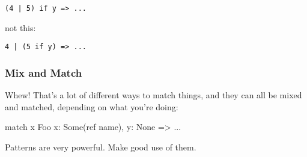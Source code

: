 \begin{verbatim}
(4 | 5) if y => ...
\end{verbatim}

not this:

\begin{verbatim}
4 | (5 if y) => ...
\end{verbatim}

\subsubsection*{Mix and Match}

Whew! That's a lot of different ways to match things, and they can all be mixed and matched, depending on what you're doing:

\begin{rustc}
match x {
    Foo { x: Some(ref name), y: None } => ...
}
\end{rustc}

Patterns are very powerful. Make good use of them.
